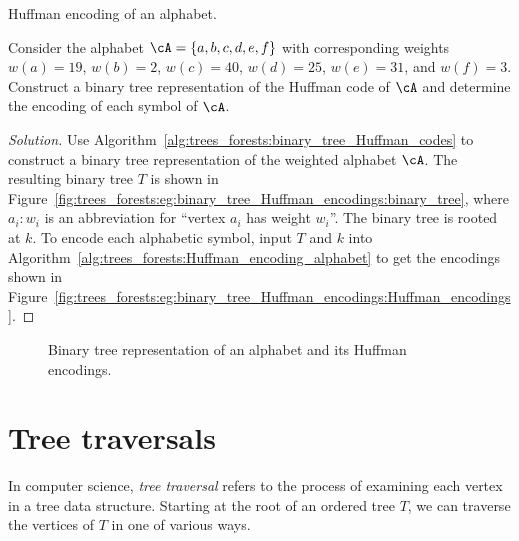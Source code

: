 \begin{algorithm}[!htbp]

\caption{Huffman encoding of an alphabet.}
\label{alg:trees_forests:Huffman_encoding_alphabet}
\end{algorithm}

\begin{example}
Consider the alphabet $\cA = \{a, b, c, d, e, f\}$ with corresponding
weights $w(a) = 19$, $w(b) = 2$, $w(c) = 40$, $w(d) = 25$,
$w(e) = 31$, and $w(f) = 3$. Construct a binary tree representation of
the Huffman code of $\cA$ and determine the encoding of each symbol of
$\cA$.
\end{example}

\begin{proof}[Solution]
Use Algorithm~\ref{alg:trees_forests:binary_tree_Huffman_codes} to
construct a binary tree representation of the weighted alphabet
$\cA$. The resulting binary tree $T$ is shown in
Figure~\ref{fig:trees_forests:eg:binary_tree_Huffman_encodings:binary_tree},
where $a_i: w_i$ is an abbreviation for
``vertex $a_i$ has weight $w_i$''. The binary tree is rooted at
$k$. To encode each alphabetic symbol, input $T$ and $k$ into
Algorithm~\ref{alg:trees_forests:Huffman_encoding_alphabet} to get the
encodings shown in
Figure~\ref{fig:trees_forests:eg:binary_tree_Huffman_encodings:Huffman_encodings}.
\end{proof}

\begin{figure}[!htbp]
\centering
{}

\caption{Binary tree representation of an alphabet and its Huffman encodings.}
\label{fig:trees_forests:eg:binary_tree_Huffman_encodings}
\end{figure}



\section{Tree traversals}
\label{sec:trees_forests:tree_traversals}

In computer science,
\emph{tree traversal} refers to the process of
examining each vertex in a tree data structure. Starting at the root
of an ordered tree $T$, we can traverse the
vertices of $T$ in one of various ways.

